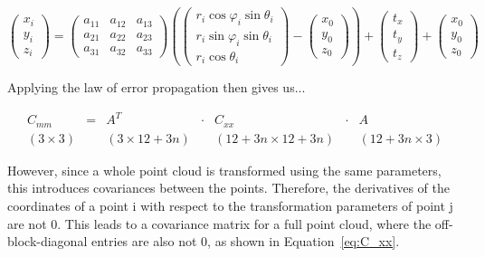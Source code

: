 \documentclass[preprint,12pt,3p]{elsarticle}
\begin{document}
\begin{equation}
    \begin{pmatrix}
    x_i \\
    y_i \\
    z_i 
    \end{pmatrix} = 
    \begin{pmatrix}
    a_{11} & a_{12} & a_{13} \\
    a_{21} & a_{22} & a_{23} \\
    a_{31} & a_{32} & a_{33} 
    \end{pmatrix}
    \left(
    \begin{pmatrix}
        r_i \cos{\varphi_i} \sin{\theta_i}\\
        r_i \sin{\varphi_i} \sin{\theta_i}\\
        r_i \cos{\theta_i}
    \end{pmatrix}
    -
    \begin{pmatrix}
    x_0 \\
    y_0 \\
    z_0
    \end{pmatrix}
    \right)
    +
    \begin{pmatrix}
    t_x \\
    t_y \\
    t_z
    \end{pmatrix}
    + 
    \begin{pmatrix}
    x_0 \\
    y_0 \\
    z_0
    \end{pmatrix}
    \label{eq:obs_ICP}
\end{equation}

Applying the law of error propagation then gives us...

\begin{equation}
\begin{matrix}
C_{mm} & = & A^T & \cdot &  C_{xx} & \cdot & A \\
(3 \times 3) & & (3 \times 12+3n) & & (12+3n \times 12+3n) & & (12+3n \times 3)
\end{matrix}
\end{equation}

However, since a whole point cloud is transformed using the same parameters, this introduces covariances between the points. Therefore, the derivatives of the coordinates of a point i with respect to the transformation parameters of point j are not 0. This leads to a covariance matrix for a full point cloud, where the off-block-diagonal entries are also not 0, as shown in Equation~\ref{eq:C_xx}.
\end{document}
